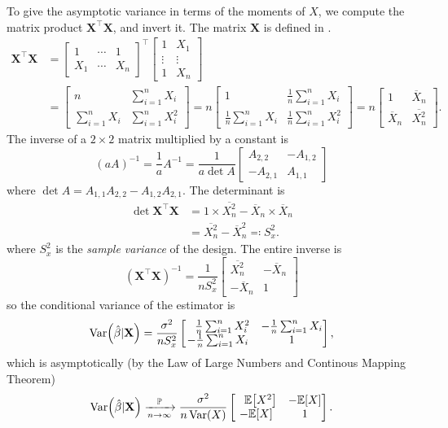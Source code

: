\documentclass[letterpaper, reqno]{amsart}
\numberwithin{equation}{section}
\newcommand{\T}{\top} %
\newcommand{\vect}[1]{\boldsymbol{\mathbf{#1}}} %
\newcommand{\E}[1]{\mathbb{E}\mleft[#1\mright]}
\newcommand{\Var}[1]{\operatorname{Var}\mleft(#1\mright)}
\newcommand{\sumi}[2]{\sum_{#1=1}^{#2}}
\newcommand{\avg}[2]{\frac{1}{#2}\sumi{#1}{#2}}
\newcommand{\Plim}{\xrightarrow[n \to \infty]{\mathbb{P}}}
\newcommand{\Xnbar}{\overline{X}_n}
\newcommand{\Xsqbar}{\overline{X_n^2}}
\newcommand{\Xm}{\vect{X}}
\newcommand{\Bvh}{\hat{\beta}}
\begin{document}
To give the asymptotic variance in terms of the moments of $X$, we compute the
matrix product $\Xm^\T\Xm$, and invert it. The matrix $\Xm$ is defined in
.
{\everymath{\displaystyle}
\begin{align*}
  \Xm^\T \Xm &=
  \begin{bmatrix} 
    1   & \cdots & 1   \\
    X_1 & \cdots & X_n
  \end{bmatrix}^\T
  \begin{bmatrix} 
    1      & X_1    \\
    \vdots & \vdots \\
    1      & X_n
  \end{bmatrix} \\
  &=
  \begin{bmatrix}
    n               & \sumi{i}{n} X_i   \\
    \sumi{i}{n} X_i & \sumi{i}{n} X_i^2
  \end{bmatrix}
  =
  n
  \begin{bmatrix}
    1              & \avg{i}{n} X_i   \\
    \avg{i}{n} X_i & \avg{i}{n} X_i^2
  \end{bmatrix}
  =
  n
  \begin{bmatrix}
    1      & \Xnbar   \\
    \Xnbar & \Xsqbar
  \end{bmatrix}.
\end{align*}
}
The inverse of a $2 \times 2$ matrix multiplied by a constant is
\[ (a A)^{-1} = \frac{1}{a} A^{-1} = \frac{1}{a \det A} 
  \begin{bmatrix}
     A_{2,2} & -A_{1,2} \\
    -A_{2,1} &  A_{1,1}
  \end{bmatrix} 
\]
where $\det A = A_{1,1}A_{2,2} - A_{1,2}A_{2,1}$.
The determinant is
\begin{align*}
  \det \Xm^\T \Xm &= 1 \times \Xsqbar - \Xnbar \times \Xnbar \\
  &= \Xsqbar - \Xnbar^2 \eqqcolon S_x^2.
\end{align*}
where $S_x^2$ is the \emph{sample variance} of the design.
The entire inverse is
\[ (\Xm^\T \Xm)^{-1} = \frac{1}{n S_x^2}
  \begin{bmatrix}
    \Xsqbar & -\Xnbar \\
    -\Xnbar & 1
  \end{bmatrix}
\]
so the conditional variance of the estimator is
{\everymath{\displaystyle}
\[ \Var{\Bvh|\Xm} = \frac{\sigma^2}{n S_x^2}
  \begin{bmatrix}
    \phantom{-}\avg{i}{n} X_i^2 & -\avg{i}{n}X_i \\
    -\avg{i}{n}X_i   & 1
  \end{bmatrix},
\] which is asymptotically (by the Law of Large Numbers and Continous Mapping
Theorem)
\[ \Var{\Bvh|\Xm} \Plim \frac{\sigma^2}{n \Var{X}}
  \begin{bmatrix}
    \phantom{-}\E{X^2}  & -\E{X} \\
    -\E{X}              & 1
  \end{bmatrix}.
\]
}
\end{document}
